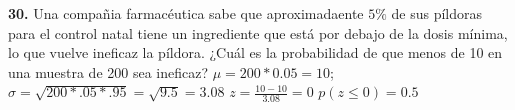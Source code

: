\documentclass[12pt, letterpaper]{article}
\begin{document}
    \textbf{30. }Una compañia farmacéutica sabe que aproximadaente $5\%$ de sus píldoras para el control natal tiene un
    ingrediente que está por debajo de la dosis mínima, lo que vuelve ineficaz la píldora. ¿Cuál es la probabilidad de que
    menos de 10 en una muestra de 200 sea ineficaz?\vskip0.5cm
        $\mu = 200*0.05=10$; $\sigma = \sqrt{200*.05*.95}=\sqrt{9.5}=3.08$\vskip0.5cm
        $z=\displaystyle\frac{10-10}{3.08}=0$\vskip0.5cm
        $p(z\leq 0)=0.5$
\end{document}
